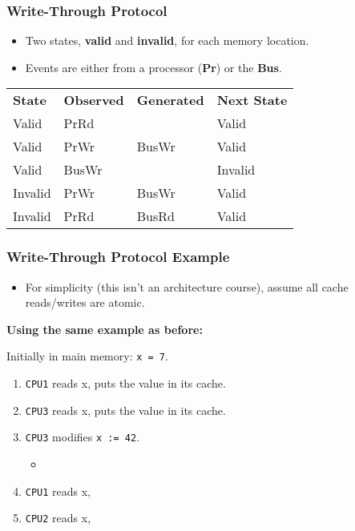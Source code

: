 \begin{frame}
  \frametitle{Write-Through Protocol}

  
  \begin{itemize}
    \item Two states, {\bf valid} and {\bf invalid}, for each memory location.
    \item Events are either from a processor ({\bf Pr}) or the {\bf Bus}.
  \end{itemize}
  \vfill
  \begin{center}
    \begin{tabular}{llll}
      {\bf State} & {\bf Observed} & {\bf Generated} & {\bf Next State}\\
      Valid   & PrRd  &       & Valid\\
      Valid   & PrWr  & BusWr & Valid\\
      Valid   & BusWr &       & Invalid\\
      Invalid & PrWr  & BusWr & Valid\\
      Invalid & PrRd  & BusRd & Valid\\
    \end{tabular}
  \end{center}
  
\end{frame}

\begin{frame}
  \frametitle{Write-Through Protocol Example}

  

  \begin{itemize}
    \item For simplicity (this isn't an architecture course), assume all cache
      reads/writes are atomic.
  \end{itemize}
  \vfill
  {\bf Using the same example as before:}

  Initially in main memory: {\tt x = 7}.

  \begin{enumerate}
    \item {\tt CPU1} reads x, puts the value in its cache. 
    \item {\tt CPU3} reads x, puts the value in its cache. 
    \item {\tt CPU3} modifies {\tt x := 42}. 
      \begin{itemize}
        \item {}
      \end{itemize}
    \item {\tt CPU1} reads x, 
    \item {\tt CPU2} reads x, 
  \end{enumerate}
  
\end{frame}

